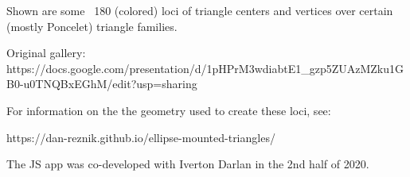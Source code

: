 Shown are some ~180 (colored) loci of triangle centers and vertices over certain (mostly Poncelet) triangle families.

Original gallery: https://docs.google.com/presentation/d/1pHPrM3wdiabtE1_gzp5ZUAzMZku1GB0-u0TNQBxEGhM/edit?usp=sharing

For information on the the geometry used to create these loci, see:

https://dan-reznik.github.io/ellipse-mounted-triangles/

The JS app was co-developed with Iverton Darlan in the 2nd half of 2020.